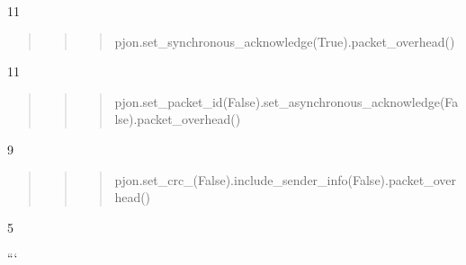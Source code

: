 11 \begin{quotation}
\begin{quotation}
\begin{quotation}
pjon.\-set\-\_\-synchronous\-\_\-acknowledge(\-True).packet\-\_\-overhead()

\end{quotation}


\end{quotation}


\end{quotation}
11 \begin{quotation}
\begin{quotation}
\begin{quotation}
pjon.\-set\-\_\-packet\-\_\-id(\-False).set\-\_\-asynchronous\-\_\-acknowledge(\-False).packet\-\_\-overhead()

\end{quotation}


\end{quotation}


\end{quotation}
9 \begin{quotation}
\begin{quotation}
\begin{quotation}
pjon.\-set\-\_\-crc\-\_(\-False).include\-\_\-sender\-\_\-info(\-False).packet\-\_\-overhead()

\end{quotation}


\end{quotation}


\end{quotation}
5

``` 